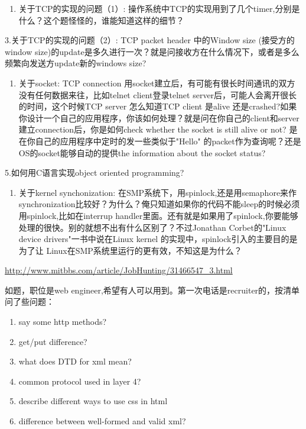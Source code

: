 \documentclass[12pt]{book}
\begin{document}
\begin{enumerate}
\item 关于TCP的实现的问题（1）: 操作系统中TCP的实现用到了几个timer,分别是什么？这个题怪怪的，谁能知道这样的细节？
\end{enumerate}

3.关于TCP的实现的问题（2）: TCP packet header 中的Window size (接受方的 window size)的update是多久进行一次？就是问接收方在什么情况下，或者是多么频繁向发送方update新的windows size?

\begin{enumerate}
\item 关于socket: TCP connection 用socket建立后，有可能有很长时间通讯的双方没有任何数据来往，比如telnet client登录telnet server后，可能人会离开很长的时间，这个时候TCP server 怎么知道TCP client 是alive 还是crashed?如果你设计一个自己的应用程序，你该如何处理？就是问在你自己的client和server建立connection后，你是如何check whether the socket is still alive or not? 是在你自己的应用程序中定时的发一些类似于"Hello" 的packet作为查询呢？还是OS的socket能够自动的提供the information about the socket status?
\end{enumerate}

5.如何用C语言实现object oriented programming?

\begin{enumerate}
\item 关于kernel synchonization: 在SMP系统下，用spinlock,还是用semaphore来作synchronization比较好？为什么？俺只知道如果你的代码不能sleep的时候必须用spinlock,比如在interrup handler里面。还有就是如果用了spinlock,你要能够处理的很快。别的就想不出有什么区别了？不过Jonathan Corbet的"Linux device drivers"一书中说在Linux kernel 的实现中，spinlock引入的主要目的是为了让 Linux在SMP系统里运行的更有效，不知这是为什么？
\end{enumerate}

\url{http://www.mitbbs.com/article/JobHunting/31466547_3.html}

如题，职位是web engineer,希望有人可以用到。第一次电话是recruiter的，按清单问了些问题：
\begin{enumerate}
\item say some http methods?
\item get/put difference?
\item what does DTD for xml mean?
\item common protocol used in layer 4?
\item describe different ways to use css in html
\item difference between well-formed and valid xml?
\end{enumerate}
\end{document}
